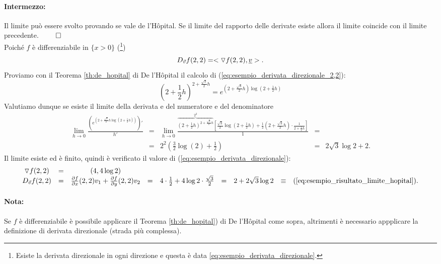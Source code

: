 \begin{example}
\begin{enumerate}
		\paragraph{Intermezzo:} Il limite può essere svolto provando se vale de l'Hôpital. Se il limite del rapporto delle derivate esiste allora il limite coincide con il limite precedente. $\qed$\\
		Poiché $f$ è differenziabile in $\{x>0\}$ (\footnote{Esiste la derivata direzionale in ogni direzione e questa è data \ref{eq:esempio_derivata_direzionale}.})
		\begin{equation}\label{eq:esempio_derivata_direzionale}
			D_{\vec v}f(2,2) = <\triangledown f(2,2), \uline v>.
		\end{equation}
		Proviamo con il Teorema \ref{th:de_hopital} di De l'Hôpital il calcolo di (\ref{eq:esempio_derivata_direzionale_2,2}):
		\begin{equation*}
			\left(2+\frac{1}{2}h\right)^{2+\frac{\sqrt{3}}{2}h} = e^{\left(2+\frac{\sqrt{3}}{2}h\right)\log\left(2+\frac{1}{2}h\right)}
		\end{equation*}
		Valutiamo dunque se esiste il limite della derivata e del numeratore e del denominatore
		\begin{equation}\label{eq:esempio_risultato_limite_hopital}
			\begin{matrix}
				\lim\limits_{h\rightarrow 0} \frac{\left(e^{\left(2+\frac{\sqrt{3}}{2}h\log\left(2+\frac{1}{2}h\right)\right)}\right)'}{h'} &=& \lim\limits_{h\rightarrow0}\frac{\overbrace{\left(2+\frac{1}{2}h\right)^{2+\frac{\sqrt{3}}{2}h}}^{2^2} \left[\frac{\sqrt{3}}{2}\log\left(2+\frac{1}{2}h\right) + \frac{1}{2}\left(2+\frac{\sqrt{3}}{2}h\right)\cdot\frac{1}{2+\frac{1}{2}h}\right]}{1}&=&\\
				&=& 2^2\left(\frac{3}{2}\log(2)+\frac{1}{2}\right)&=&
				 2\sqrt{3}\log2 + 2.
			\end{matrix}
		\end{equation}
		Il limite esiste ed è finito, quindi è verificato il valore di (\ref{eq:esempio_derivata_direzionale}):
		\begin{equation*}
			\begin{matrix}
				\triangledown f(2,2) &=& (4,4\log2) && && &&\\
				D_{\vec{v}} f(2,2) &=& \frac{\partial f}{\partial x} (2,2) v_1 + \frac{\partial f}{\partial y}(2,2)v_2 &=& 4\cdot\frac{1}{2} + 4 \log 2 \cdot \frac{\sqrt{3}}{2} &=& 2 + 2\sqrt{3} \log 2 &\equiv& (\ref{eq:esempio_risultato_limite_hopital}).
			\end{matrix}
		\end{equation*}
		\paragraph{Nota:} Se $f$ è differenziabile è possibile applicare il Teorema \ref{th:de_hopital}) di De l'Hôpital come sopra, altrimenti è necessario appplicare la definizione di derivata direzionale (strada più complessa).
	\end{enumerate}
\end{example}

